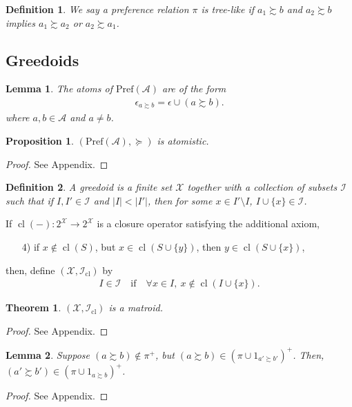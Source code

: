 \documentclass[conference]{ieeeconf}
\newcommand{\powerset}[1]{2^{#1}}
\newcommand{\A}{\mathcal{A}}
\newcommand{\X}{\mathcal{X}}
\newcommand{\I}{\mathcal{I}}
\newcommand{\Pref}{\mathrm{Pref}}
\newcommand{\prefers}{\succsim}
\DeclareMathOperator{\cl}{cl}
\newtheorem{theorem}{Theorem}
\newtheorem{lemma}{Lemma}
\newtheorem{proposition}{Proposition}
\newtheorem{definition}{Definition}
\begin{document}
\begin{definition} \label{def:tree-like}
    We say a preference relation $\pi$ is \emph{tree-like} if $a_1 \prefers b$ and $a_2 \prefers b$ implies $a_1 \prefers a_2$ or $a_2 \prefers a_1$.
\end{definition}



\subsection{Greedoids}

\begin{lemma}
    The atoms of $\Pref(\A)$ are of the form
    \begin{align*}
        \epsilon_{a \prefers b} = \epsilon \cup (a \prefers b).
    \end{align*}
    where $a, b \in \A$ and $a \neq b$.
\end{lemma}

\begin{proposition}
    $(\Pref(\A), \succeq)$ is atomistic.
\end{proposition}
\begin{proof}
See Appendix.
\end{proof}

\begin{definition}
    A \emph{greedoid} is a finite set $\X$ together with a collection of subsets $\I$ such that if $I, I' \in \mathcal{I}$ and $|I| < |I'|$, then for some $x \in I' \setminus I$, $I \cup \{x\} \in \I$.
\end{definition}

If $\cl(-): \powerset{\X} \to \powerset{\X}$ is a closure operator satisfying the additional axiom,
\begin{enumerate}
    \item[4)] if $x \notin \cl(S)$, but $x \in \cl(S \cup \{y\})$, then $y \in \cl(S \cup \{x\})$,
\end{enumerate}
then, define $(\X,\I_{\cl})$ by
\begin{align*}
    I \in \I \quad \text{if} \quad \forall x \in I,~x \notin \cl(I \cup \{x\}).
\end{align*}
\begin{theorem}
    $(\X, \I_{\cl})$ is a matroid.
\end{theorem}
\begin{proof}
    See Appendix.
\end{proof}

\begin{lemma}
    Suppose $(a \prefers b) \notin \pi^{+}$, but $(a \prefers b) \in \left(\pi \cup 1_{a' \prefers b'}\right)^{+}$. Then, $(a' \prefers b') \in \left( \pi \cup 1_{a \prefers b} \right)^{+}$.
\end{lemma}
\begin{proof}
    See Appendix.
\end{proof}
\end{document}
